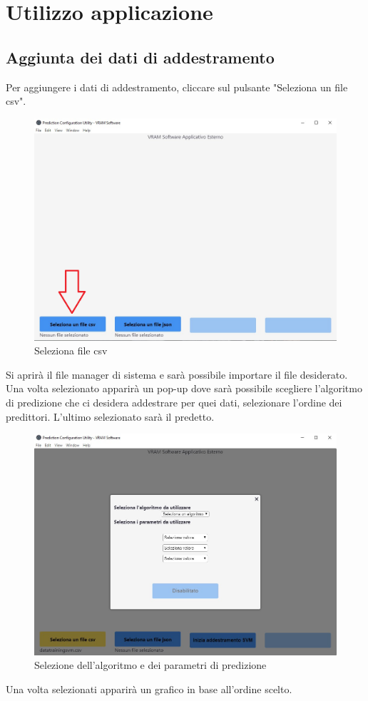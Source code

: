 \section{Utilizzo applicazione}
	\subsection{Aggiunta dei dati di addestramento}
	Per aggiungere i dati di addestramento, cliccare sul pulsante "Seleziona un file csv".
	\begin{figure}[H] 	
		\begin{center}
			\includegraphics[width=\linewidth]{img/1.png}
		\end{center}
		\caption{Seleziona file csv}	
	\end{figure}
	Si aprirà il file manager di sistema e sarà possibile importare il file desiderato. Una volta selezionato apparirà un pop-up dove sarà possibile scegliere l'algoritmo di predizione che ci desidera addestrare per quei dati, selezionare l'ordine dei predittori. L'ultimo selezionato sarà il predetto.
	\begin{figure}[H] 	
		\begin{center}
			\includegraphics[width=\linewidth]{img/2.jpg}
		\end{center}
		\caption{Selezione dell'algoritmo e dei parametri di predizione}	
	\end{figure}
	Una volta selezionati apparirà un grafico in base all'ordine scelto.
